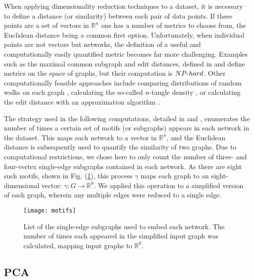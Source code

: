   When applying dimensionality reduction techniques to a dataset, it
  is necessary to define a distance (or similarity) between each pair
  of data points.
  If these points are a set of vectors in $\mathbb{R}^n$ one has a
  number of metrics to choose from, the Euclidean distance being a
  common first option.
  Unfortunately, when individual points are not vectors but networks,
  the definition of a useful and computationally easily quantified
  metric becomes far more challenging.
  Examples such as the maximal common subgraph and edit distances,
  defined in \cite{bunke_graph_1998} and \cite{gao_survey_2010} define
  metrics on the space of graphs, but their computation is
  $NP\textnormal{-}hard$.
  Other computationally feasible approaches include comparing
  distributions of random walks on each graph
  \cite{vishwanathan_graph_2010}, calculating the so-called $n$-tangle
  density \cite{gallos_revealing_2014}, or calculating the edit
  distance
  with an approximation algorithm \cite{riesen_approximate_2009,zeng_comparing_2009}.

  The strategy used in the following computations, detailed in
  \cite{rajendran_analysis_2013} and \cite{xiao_structure-based_2008},
  enumerates the number of times a certain set of motifs (or
  subgraphs) appears in each network in the dataset.
  This maps each network to a vector in $\mathbb{R}^n$, and the
  Euclidean distance is subsequently used to quantify the similarity
  of two graphs.
  Due to computational restrictions, we chose here to only count the
  number of three- and four-vertex single-edge subgraphs contained in
  each network.
  As there are eight such motifs, shown in Fig. (\ref{fig:motifs}),
  this process $\gamma$ maps each graph to an eight-dimensional
  vector: $\gamma : G \rightarrow \mathbb{R}^8$.
  We applied this operation to a simplified version of each graph,
  wherein any multiple edges were reduced to a single edge.

  \begin{figure}
    \vspace{-5mm} \centering
    \texttt{[image: motifs]}
    \caption[List of subgraphs used to embed multigraphs]{List of the
      single-edge subgraphs used to embed each network.  The number of
      times each appeared in the simplified input graph was
      calculated, mapping input graphs to
      $\mathbb{R}^8$. \label{fig:motifs}}
  \end{figure}

  \subsection{PCA\label{sec:pca}}
  

